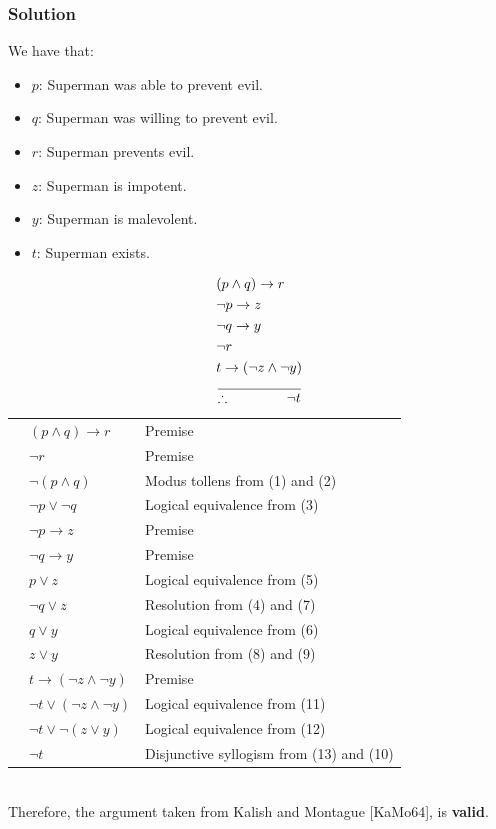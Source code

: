 \documentclass{article}
\begin{document}
\subsubsection*{Solution}
We have that:
\begin{itemize}
    \item $p$: Superman was able to prevent evil.
    \item $q$: Superman was willing to prevent evil.
    \item $r$: Superman prevents evil.
    \item $z$: Superman is impotent.
    \item $y$: Superman is malevolent.
    \item $t$: Superman exists.
\end{itemize}
\begin{align*}
     & (p \land q) \to r                           \\
     & \lnot p \to z                               \\
     & \lnot q \to y                               \\
     & \lnot r                                     \\
     & t \to (\lnot z \land \lnot y)               \\
     & \over \therefore\quad\quad\quad\quad\lnot t
\end{align*}
\newcommand{\rowhe}[2]{\stepcounter{rowzz}\arabic{rowzz} & #1 & #2 \\}
\begin{tabular}{r l l}
    \rowhe{$(p \land q) \to r$}{Premise}
    \rowhe{$\lnot r$}{Premise}
    \rowhe{$\lnot(p \land q)$}{Modus tollens from (1) and (2)}
    \rowhe{$\lnot p \lor \lnot q$}{Logical equivalence from (3)}
    \rowhe{$\lnot p \to z$}{Premise}
    \rowhe{$\lnot q \to y$}{Premise}
    \rowhe{$p \lor z$}{Logical equivalence from (5)}
    \rowhe{$\lnot q \lor z$}{Resolution from (4) and (7)}
    \rowhe{$q \lor y$}{Logical equivalence from (6)}
    \rowhe{$z \lor y$}{Resolution from (8) and (9)}
    \rowhe{$t \to (\lnot z \land \lnot y)$}{Premise}
    \rowhe{$\lnot t \lor (\lnot z \land \lnot y)$}{Logical equivalence from (11)}
    \rowhe{$\lnot t \lor \lnot(z \lor y)$}{Logical equivalence from (12)}
    \rowhe{$\lnot t$}{Disjunctive syllogism from (13) and (10)}
\end{tabular}\\

Therefore, the argument taken from Kalish and Montague [KaMo64], is \textbf{valid}.
\end{document}
